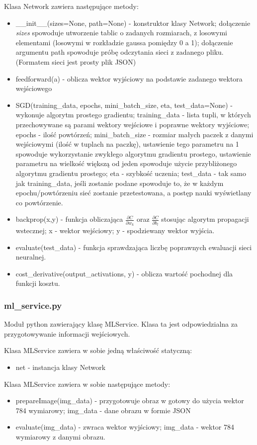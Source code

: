 \documentclass{article}
\begin{document}
Klasa Network zawiera następujące metody:
\begin{itemize}
    \item \_\_init\_\_(sizes=None, path=None) - konstruktor klasy Network; dołączenie \textit{sizes} spowoduje utworzenie tablic o zadanych rozmiarach, z losowymi elementami (losowymi w rozkładzie gaussa pomiędzy 0 a 1);
    dołączenie argumentu path spowoduje próbę odczytania sieci z zadanego pliku. (Formatem sieci jest prosty plik JSON)
    \item feedforward(a) - oblicza wektor wyjściowy na podstawie zadanego wektora wejściowego
    \item SGD(training\_data, epochs, mini\_batch\_size, eta, test\_data=None) - wykonuje algorytm prostego gradientu; training\_data - lista tupli, w których przechowywane są parami wektory wejściowe i poprawne wektory wyjściowe;
    epochs - ilość powtórzeń; mini\_batch\_size - rozmiar małych paczek z danymi wejściowymi (ilość w tuplach na paczkę), ustawienie tego parametru na 1 spowoduje wykorzystanie zwykłego
    algorytmu gradientu prostego, ustawienie parametru na wielkość większą od jeden spowoduje użycie przybliżonego algorytmu gradientu prostego; eta - szybkość uczenia; test\_data - tak samo jak training\_data, jeśli zostanie podane
    spowoduje to, że w każdym epochu/powtórzeniu sieć zostanie przetestowana, a postęp nauki wyświetlany co powtórzenie.
    \item backprop(x,y) - funkcja obliczająca $\frac{\partial C}{\partial w_k}$ oraz $\frac{\partial C}{\partial b_l}$ stosując algorytm propagacji wstecznej; x - wektor wejściowy; y - spodziewany wektor wyjścia.
    \item evaluate(test\_data) - funkcja sprawdzająca liczbę poprawnych ewaluacji sieci neuralnej.
    \item cost\_derivative(output\_activations, y) - oblicza wartość pochodnej dla funkcji kosztu.
\end{itemize}


\subsubsection{ml\_service.py}
Moduł python zawierający klasę MLService. Klasa ta jest odpowiedzialna za przygotowywanie informacji wejściowych.

Klasa MLService zawiera w sobie jedną właściwość statyczną:
\begin{itemize}
    \item net - instancja klasy Network
\end{itemize}

Klasa MLService zawiera w sobie następujące metody:
\begin{itemize}
    \item prepareImage(img\_data) - przygotowuje obraz w gotowy do użycia wektor 784 wymiarowy; img\_data - dane obrazu w formie JSON
    \item evaluate(img\_data) - zwraca wektor wyjściowy; img\_data - wektor 784 wymiarowy z danymi obrazu.
\end{itemize}
\end{document}
